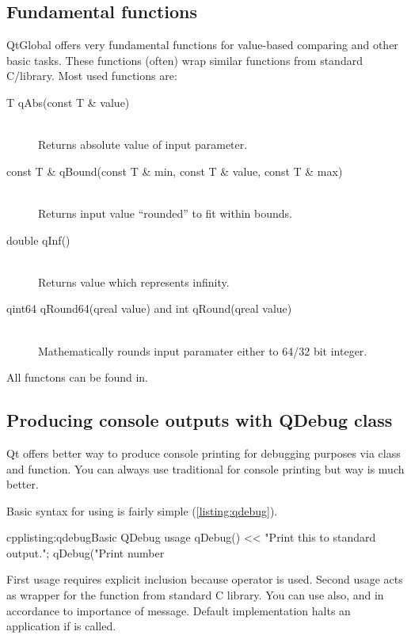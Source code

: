 \subsection{Fundamental functions}
QtGlobal offers very fundamental functions for value-based comparing and other basic tasks. These functions (often) wrap similar functions from standard C/\cpp library. Most used functions are:
\begin{description}
\item[T qAbs(const T \& value)] \hfill \\
Returns absolute value of input parameter.
\item[const T \& qBound(const T \& min, const T \& value, const T \& max)] \hfill \\
Returns input value \enquote{rounded} to fit within bounds.
\item[double qInf()] \hfill \\
Returns value which represents infinity.
\item[qint64 qRound64(qreal value) and int qRound(qreal value)] \hfill \\
Mathematically rounds input paramater either to 64/32 bit integer.
\end{description}

All functons can be found in.

\subsection{Producing console outputs with QDebug class}
Qt offers better way to produce console printing for debugging purposes via  class and function. You can always use traditional for console printing but way is much better.

Basic syntax for using is fairly simple (\autoref{listing:qdebug}).

\begin{fdoccode}{cpp}{listing:qdebug}{Basic QDebug usage}
qDebug() << "Print this to standard output.";
qDebug("Print number %
\end{fdoccode}

First usage requires explicit inclusion because operator is used. Second usage acts as wrapper for the function from standard C library. You can use also, and in accordance to importance of message. Default implementation halts an application if is called.

